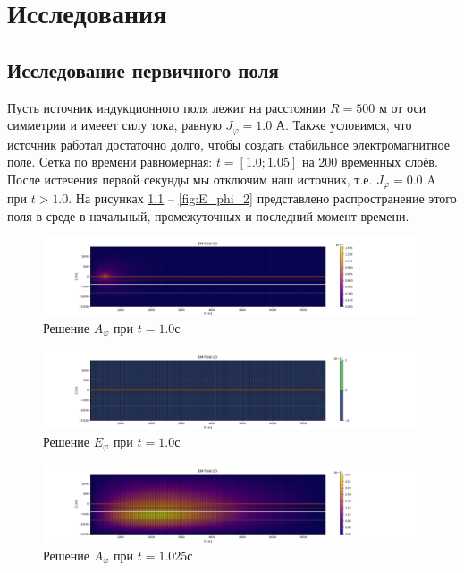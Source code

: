 \chapter{Исследования}

\section{Исследование первичного поля}

Пусть источник индукционного поля лежит на расстоянии $R = 500$ м от оси симметрии и имееет силу тока, равную $J_{\varphi} = 1.0$ А. Также условимся, что источник работал достаточно долго, чтобы создать стабильное электромагнитное поле. Сетка по времени равномерная: $t=[1.0; 1.05]$ на 200 временных слоёв. После истечения первой секунды мы отключим наш источник, т.е. $J_{\varphi} = 0.0$ A при $t > 1.0$. На рисунках \ref{fig:A_phi_0} -- \ref{fig:E_phi_2} представлено распространение этого поля в среде в начальный, промежуточных и последний момент времени.

\begin{figure}
	\centering
	\includegraphics[width=1.0\linewidth]{images/Answer_A_time_layer_1.png}
	\caption{Решение $A_{\varphi}$ при $t = 1.0с$}
	\label{fig:A_phi_0}
\end{figure}

\begin{figure}
	\centering
	\includegraphics[width=1.0\linewidth]{images/Answer_E_time_layer_1.png}
	\caption{Решение $E_{\varphi}$ при $t = 1.0с$}
	\label{fig:E_phi_0}
\end{figure}

\begin{figure}
	\centering
	\includegraphics[width=1.0\linewidth]{images/Answer_A_time_layer_1.0250000000000083.png}
	\caption{Решение $A_{\varphi}$ при $t = 1.025с$}
	\label{fig:A_phi_1}
\end{figure}

